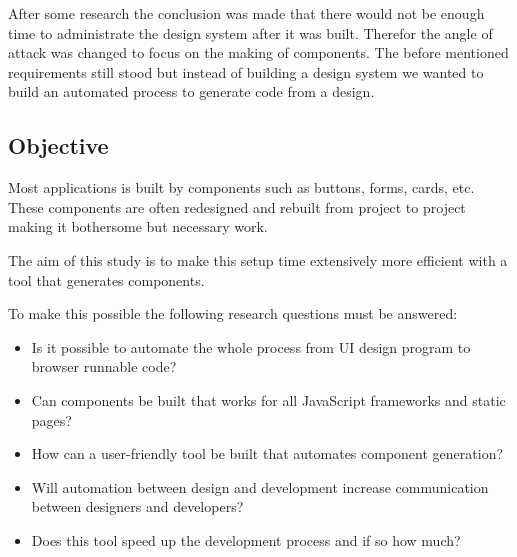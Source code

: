 After some research the conclusion was made that there would not be enough time to administrate the design system after it was built. Therefor the angle of attack was changed to focus on the making of components. The before mentioned requirements still stood but instead of building a design system we wanted to build an automated process to generate code from a design. 








\subsection{Objective}
\label{sub:Objective}
Most applications is built by components such as buttons, forms, cards\cite{babichSimpleDesignTips2020}, etc. These components are often redesigned and rebuilt from project to project making it bothersome but necessary work.


The aim of this study is to make this setup time extensively more efficient with a tool that generates components. 

To make this possible the following research questions must be answered:
\begin{itemize}
  \item Is it possible to automate the whole process from UI design program to browser runnable code? 
 \item Can components be built that works for all JavaScript frameworks and static pages?
  \item How can a user-friendly tool be built that automates component generation?  
  \item Will automation between design and development increase communication between designers and developers?
  \item Does this tool speed up the development process and if so how much?
\end{itemize}


